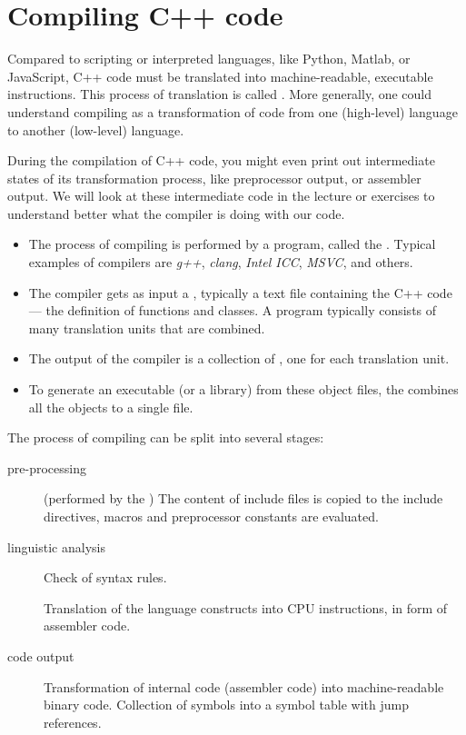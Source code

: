 \section{Compiling C++ code\label{sec:compiling}}
Compared to scripting or interpreted languages, like Python, Matlab, or JavaScript, C++ code must be translated into machine-readable, executable instructions. This process of translation is called . More generally, one could understand compiling as a transformation of code from one (high-level) language to another (low-level) language.

\begin{rem}
  During the compilation of C++ code, you might even print out intermediate states of its transformation process, like preprocessor output, or assembler output. We will look at these intermediate code in the lecture or exercises to understand better what the compiler is doing with our code.
\end{rem}

\begin{itemize}
  \item The process of compiling is performed by a program, called the . Typical examples of compilers are \emph{g++}, \emph{clang}, \emph{Intel ICC}, \emph{MSVC}, and others.

  \item The compiler gets as input a , typically a text file containing the C++ code --- the definition of functions and classes. A program typically consists of many translation units that are combined.

  \item The output of the compiler is a collection of , one for each translation unit.

  \item To generate an executable (or a library) from these object files, the  combines all the objects to a single file.
\end{itemize}

The process of compiling can be split into several stages:
\begin{description}
  \item[pre-processing] (performed by the ) The content of include files is copied to the include directives, macros and preprocessor constants are evaluated.

  \item[linguistic analysis] Check of syntax rules.

  \item[] Translation of the language constructs into CPU instructions, \eg in form of assembler code.

  \item[code output] Transformation of internal code (assembler code) into machine-readable binary code. Collection of symbols into a symbol table with jump references.
\end{description}

